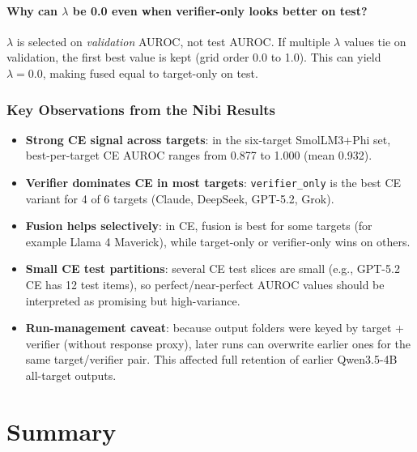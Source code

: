 \documentclass[11pt]{article}
\begin{document}
\paragraph{Why can $\lambda$ be 0.0 even when verifier-only looks better on test?}
$\lambda$ is selected on \emph{validation} AUROC, not test AUROC. If multiple $\lambda$ values tie on validation, the first best value is kept (grid order 0.0 to 1.0). This can yield $\lambda=0.0$, making fused equal to target-only on test.

\subsubsection{Key Observations from the Nibi Results}

\begin{itemize}
    \item \textbf{Strong CE signal across targets}: in the six-target SmolLM3+Phi set, best-per-target CE AUROC ranges from 0.877 to 1.000 (mean 0.932).
    \item \textbf{Verifier dominates CE in most targets}: \texttt{verifier\_only} is the best CE variant for 4 of 6 targets (Claude, DeepSeek, GPT-5.2, Grok).
    \item \textbf{Fusion helps selectively}: in CE, fusion is best for some targets (for example Llama 4 Maverick), while target-only or verifier-only wins on others.
    \item \textbf{Small CE test partitions}: several CE test slices are small (e.g., GPT-5.2 CE has 12 test items), so perfect/near-perfect AUROC values should be interpreted as promising but high-variance.
    \item \textbf{Run-management caveat}: because output folders were keyed by target + verifier (without response proxy), later runs can overwrite earlier ones for the same target/verifier pair. This affected full retention of earlier Qwen3.5-4B all-target outputs.
\end{itemize}

\section{Summary}
\end{document}
